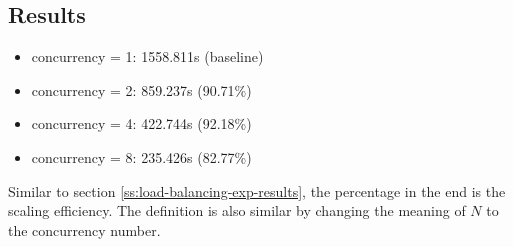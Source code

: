 \subsection{Results}

\begin{itemize}
    \item concurrency = 1: 1558.811s (baseline)
    \item concurrency = 2: 859.237s (90.71\%)
    \item concurrency = 4: 422.744s (92.18\%)
    \item concurrency = 8: 235.426s (82.77\%)
\end{itemize}

Similar to section \ref{ss:load-balancing-exp-results}, the percentage in the end is the scaling efficiency. The definition is also similar by changing the meaning of $N$ to the concurrency number.